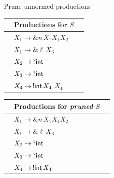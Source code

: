 \documentclass[10pt]{beamer}
\begin{document}
\begin{frame} {Prune unnormed productions}
	\vspace*{-2mm}
	\hspace*{5mm}\begin{tabular}{l l l }
 		&Productions for $S$&  \\ \hline
 	 	&$X_1 \rightarrow \& n\, X_1 X_1 X_2$ &\\
 	 	&$X_1 \rightarrow \& \ell\, X_3$ &\\
 	 	&$X_2 \rightarrow \,? \mathsf{int}$&\\
 	 	&$X_3 \rightarrow \,? \mathsf{int}$&\\
        &$X_4 \rightarrow \,!\mathsf{int}\, X_4$ {\color{red} $X_4$ } &\\                   
	\end{tabular}
	\hspace*{1cm} \pause
	\begin{tabular}{l l l }
 		&Productions for \emph{pruned} $S$&  \\ \hline
  		&\hspace*{4mm}$X_1 \rightarrow \& n\, X_1 X_1 X_2$ & \\
  		&\hspace*{4mm}$X_1 \rightarrow \& \ell\, X_3$ &\\
 		&\hspace*{4mm}$X_2 \rightarrow \,? \mathsf{int}$&\\
  		&\hspace*{4mm}$X_3 \rightarrow \,? \mathsf{int}$&\\
  		&\hspace*{4mm}$X_4 \rightarrow \,!\mathsf{int}\, X_4 $ &\\
	\end{tabular}
 	\vspace*{2mm}
\end{frame}

\end{document}
